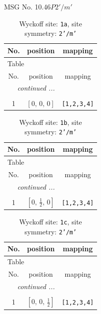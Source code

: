 \documentclass[fleqn,8pt]{jsarticle}
\begin{document}
\setcounter{MaxMatrixCols}{32}

\renewcommand{\tablename}{Table~}
\renewcommand{\figurename}{Figure~}
\begin{center}
\LARGE
MSG No. 10.46\quad$P2'/m'$
\end{center}
\renewcommand{\arraystretch}{1.2}
\begin{longtable}{ccc}
\caption{Wyckoff site: {\tt 1a}, site symmetry: {\tt 2'/m'}}
 \\
 \hline \hline
No. & position & mapping \\ \hline \endfirsthead

\multicolumn{2}{l}{\tablename\ \thetable{}} \\
 \hline \hline
No. & position & mapping \\ \hline \endhead

 \hline \hline
\multicolumn{2}{r}{\footnotesize\it continued ...} \\ \endfoot

 \hline \hline
\multicolumn{2}{r}{} \\ \endlastfoot

1 & $\left[ 0,\, 0,\, 0 \right]$ & {\tt [1,2,3,4]} \\
\end{longtable}
\renewcommand{\arraystretch}{1.2}
\begin{longtable}{ccc}
\caption{Wyckoff site: {\tt 1b}, site symmetry: {\tt 2'/m'}}
 \\
 \hline \hline
No. & position & mapping \\ \hline \endfirsthead

\multicolumn{2}{l}{\tablename\ \thetable{}} \\
 \hline \hline
No. & position & mapping \\ \hline \endhead

 \hline \hline
\multicolumn{2}{r}{\footnotesize\it continued ...} \\ \endfoot

 \hline \hline
\multicolumn{2}{r}{} \\ \endlastfoot

1 & $\left[ 0,\, \frac{1}{2},\, 0 \right]$ & {\tt [1,2,3,4]} \\
\end{longtable}
\renewcommand{\arraystretch}{1.2}
\begin{longtable}{ccc}
\caption{Wyckoff site: {\tt 1c}, site symmetry: {\tt 2'/m'}}
 \\
 \hline \hline
No. & position & mapping \\ \hline \endfirsthead

\multicolumn{2}{l}{\tablename\ \thetable{}} \\
 \hline \hline
No. & position & mapping \\ \hline \endhead

 \hline \hline
\multicolumn{2}{r}{\footnotesize\it continued ...} \\ \endfoot

 \hline \hline
\multicolumn{2}{r}{} \\ \endlastfoot

1 & $\left[ 0,\, 0,\, \frac{1}{2} \right]$ & {\tt [1,2,3,4]} \\
\end{longtable}
\end{document}
